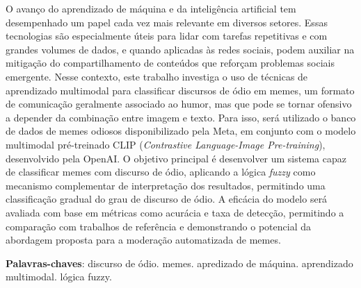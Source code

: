 \setlength{\absparsep}{18pt}
\begin{resumo}

O avanço do aprendizado de máquina e da inteligência artificial tem desempenhado um papel cada vez mais relevante em diversos setores. Essas tecnologias são especialmente úteis para lidar com tarefas repetitivas e com grandes volumes de dados, e quando aplicadas às redes sociais, podem auxiliar na mitigação do compartilhamento de conteúdos que reforçam problemas sociais emergente. Nesse contexto, este trabalho investiga o uso de técnicas de aprendizado multimodal para classificar discursos de ódio em memes, um formato de comunicação geralmente associado ao humor, mas que pode se tornar ofensivo a depender da combinação entre imagem e texto. Para isso, será utilizado o banco de dados de memes odiosos disponibilizado pela Meta, em conjunto com o modelo multimodal pré-treinado CLIP (\textit{Contrastive Language-Image Pre-training}), desenvolvido pela OpenAI. O objetivo principal é desenvolver um sistema capaz de classificar memes com discurso de ódio, aplicando a lógica \textit{fuzzy} como mecanismo complementar de interpretação dos resultados, permitindo uma classificação gradual do grau de discurso de ódio. A eficácia do modelo será avaliada com base em métricas como acurácia e taxa de detecção, permitindo a comparação com trabalhos de referência e demonstrando o potencial da abordagem proposta para a moderação automatizada de memes.

\textbf{Palavras-chaves}: discurso de ódio. memes. apredizado de máquina. aprendizado multimodal. lógica fuzzy.
\end{resumo}
